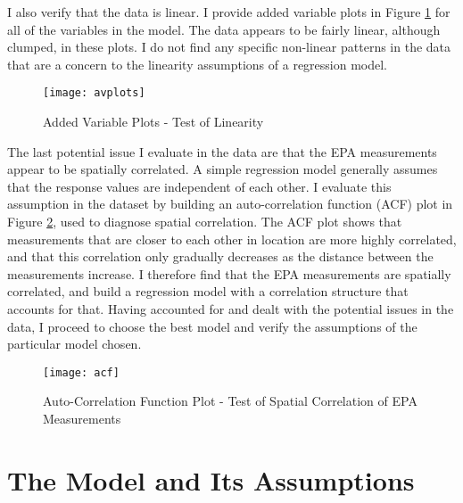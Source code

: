\documentclass{svproc}
\begin{document}
I also verify that the data is linear. I provide added variable plots in Figure \ref{avplots} for all of the variables in the model. The data appears to be fairly linear, although clumped, in these plots. I do not find any specific non-linear patterns in the data that are a concern to the linearity assumptions of a regression model.

\begin{figure}
\begin{center}
\caption{Added Variable Plots - Test of Linearity}
\texttt{[image: avplots]}
\label{avplots}
\smallskip
\end{center}
\end{figure}

The last potential issue I evaluate in the data are that the EPA measurements appear to be spatially correlated. A simple regression model generally assumes that the response values are independent of each other. I evaluate this assumption in the dataset by building an auto-correlation function (ACF) plot in Figure \ref{variogram}, used to diagnose spatial correlation. The ACF plot shows that measurements that are closer to each other in location are more highly correlated, and that this correlation only gradually decreases as the distance between the measurements increase. I therefore find that the EPA measurements are spatially correlated, and build a regression model with a correlation structure that accounts for that. Having accounted for and dealt with the potential issues in the data, I proceed to choose the best model and verify the assumptions of the particular model chosen. 

\begin{figure}
\begin{center}
\caption{Auto-Correlation Function Plot - Test of Spatial Correlation of EPA Measurements}
\texttt{[image: acf]}
\label{variogram}
\smallskip
\end{center}
\end{figure}

\smallskip

\section{The Model and Its Assumptions}
\end{document}
